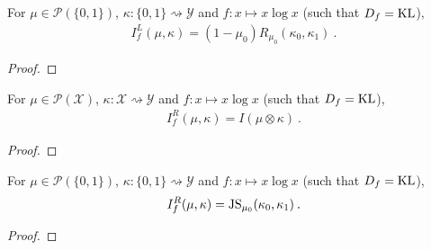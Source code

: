 \begin{lemma}
  \label{lem:fMutualInfoLeft_eq_renyi}
  For $\mu \in \mathcal P(\{0,1\})$, $\kappa : \{0,1\} \rightsquigarrow \mathcal Y$ and $f : x \mapsto x \log x$ (such that $D_f = \operatorname{KL}$),
  \begin{align*}
  I_f^L(\mu, \kappa) = (1 - \mu_0) R_{\mu_0}(\kappa_0, \kappa_1) \: .
  \end{align*}
\end{lemma}

\begin{proof}%
{}

\end{proof}


\begin{lemma}
  \label{lem:fMutualInfoRight_eq_mutualInfo}
  For $\mu \in \mathcal P(\mathcal X)$, $\kappa : \mathcal X \rightsquigarrow \mathcal Y$ and $f : x \mapsto x \log x$ (such that $D_f = \operatorname{KL}$),
  \begin{align*}
  I_f^R(\mu, \kappa) = I(\mu \otimes \kappa) \: .
  \end{align*}
\end{lemma}

\begin{proof}%
\uses{}

\end{proof}


\begin{corollary}
  \label{cor:fMutualInfoRight_eq_jensenShannon}
  For $\mu \in \mathcal P(\{0,1\})$, $\kappa : \{0,1\} \rightsquigarrow \mathcal Y$ and $f : x \mapsto x \log x$ (such that $D_f = \operatorname{KL}$),
  \begin{align*}
  I_f^R(\mu, \kappa) = \operatorname{JS}_{\mu_0}(\kappa_0, \kappa_1) \: .
  \end{align*}
\end{corollary}

\begin{proof}%
{}

\end{proof}
